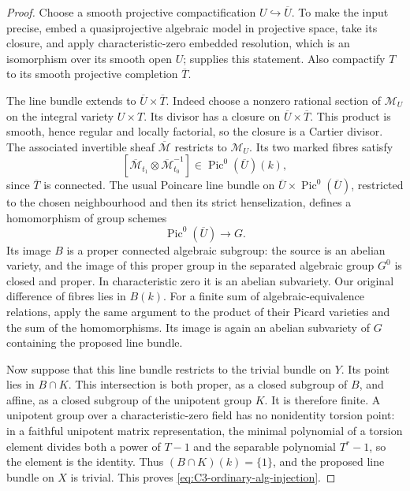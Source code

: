 \begin{proof}
Choose a smooth projective compactification
$U\hookrightarrow\overline U$. To make the input
precise, embed a quasiprojective algebraic model in
projective space, take its closure, and apply
characteristic-zero embedded resolution, which is
an isomorphism over its smooth open $U$;
\citet[Theorem 1.0.2(b)--(c), p.~781]{D_Wlodarczyk2005}
supplies this statement. Also compactify $T$ to its
smooth projective completion $\overline T$.

The line bundle extends to
$\overline U\times\overline T$. Indeed choose a
nonzero rational section of $\mathcal M_U$ on the
integral variety $U\times T$. Its divisor has a
closure on $\overline U\times\overline T$. This
product is smooth, hence regular and locally
factorial, so the closure is a Cartier divisor.
The associated invertible sheaf $\overline{\mathcal M}$
restricts to $\mathcal M_U$. Its two marked fibres
satisfy
\[
 [\overline{\mathcal M}_{t_1}\otimes
             \overline{\mathcal M}_{t_0}^{-1}]
                           \in\operatorname{Pic}^0(\overline U)(k),
\]
since $\overline T$ is connected. The usual
Poincare line bundle on
$\overline U\times\operatorname{Pic}^0(\overline U)$,
restricted to the chosen neighbourhood and then its
strict henselization, defines a homomorphism of
group schemes
\[
              \operatorname{Pic}^0(\overline U)\longrightarrow G.
\]
Its image $B$ is a proper connected algebraic subgroup:
the source is an abelian variety, and the image of
this proper group in the separated algebraic group
$G^0$ is closed and proper. In characteristic zero
it is an abelian subvariety. Our original difference
of fibres lies in $B(k)$.
For a finite sum of algebraic-equivalence relations,
apply the same argument to the product of their
Picard varieties and the sum of the homomorphisms.
Its image is again an abelian subvariety of $G$
containing the proposed line bundle.

Now suppose that this line bundle restricts to the
trivial bundle on $Y$. Its point lies in $B\cap K$.
This intersection is both proper, as a closed
subgroup of $B$, and affine, as a closed subgroup
of the unipotent group $K$. It is therefore finite.
A unipotent group over a characteristic-zero field
has no nonidentity torsion point: in a faithful
unipotent matrix representation, the minimal
polynomial of a torsion element divides both a power
of $T-1$ and the separable polynomial $T^r-1$, so
the element is the identity. Thus $(B\cap K)(k)=\{1\}$,
and the proposed line bundle on $X$ is trivial.
This proves \eqref{eq:C3-ordinary-alg-injection}.
\end{proof}

